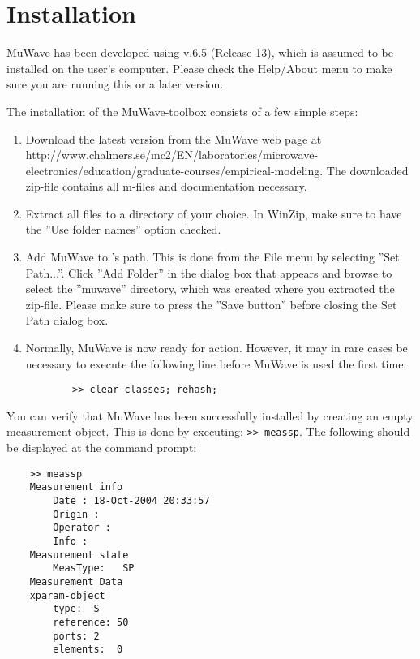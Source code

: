 %
\section{Installation}%
MuWave has been developed using \matlab v.6.5 (Release 13), which
is assumed to be installed on the user's computer. Please check
the Help/About menu to make sure you are running this or a later
version.

The installation of the MuWave-toolbox consists of a few simple
steps:
\begin{enumerate}
    \item Download the latest version from the MuWave web page at \newline http://www.chalmers.se/mc2/EN/laboratories/microwave-electronics/education/graduate-courses/empirical-modeling.
    \newline The downloaded zip-file contains all \matlab m-files and
documentation necessary.
    \item Extract all files to a directory of your choice. In WinZip, make
    sure to have the ''Use folder names'' option checked.
    \item Add MuWave to \matlab's path. This is done from the
    File menu by selecting ''Set Path...''. Click ''Add Folder''
    in the dialog box that appears and browse to select the ''muwave''
    directory, which was created where you extracted the
    zip-file. Please make sure to press the ''Save button''
    before closing the Set Path dialog box.
    \item Normally, MuWave is now ready for action. However, it
    may in rare cases be necessary to execute the following line before
    MuWave is used the first time:
    \begin{verbatim}
        >> clear classes; rehash;
    \end{verbatim}
\end{enumerate}
You can verify that MuWave has been successfully installed by
creating an empty measurement object. This is done by executing:
\verb">> meassp". The following should be displayed at the command
prompt:
\begin{verbatim}
    >> meassp
    Measurement info
        Date : 18-Oct-2004 20:33:57
        Origin :
        Operator :
        Info :
    Measurement state
        MeasType:   SP
    Measurement Data
    xparam-object
        type:  S
        reference: 50
        ports: 2
        elements:  0
\end{verbatim}
